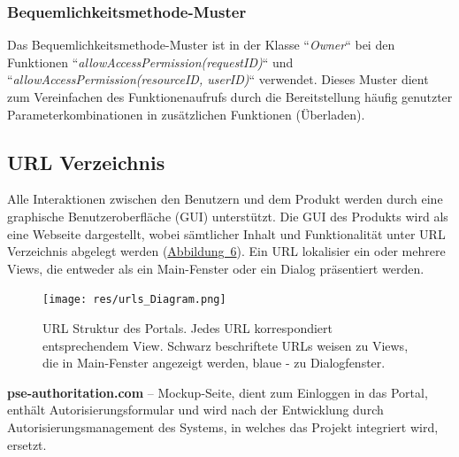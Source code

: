 \documentclass[parskip=full,11pt]{scrartcl}
\begin{document}
 \subsubsection*{Bequemlichkeitsmethode-Muster}
 Das Bequemlichkeitsmethode-Muster ist in der Klasse ``\textit{Owner}``
 bei den Funktionen ``\textit{allowAccessPermission(requestID)}`` und ``\textit{allowAccessPermission(resourceID, userID)}`` verwendet. Dieses Muster dient zum Vereinfachen des Funktionenaufrufs durch die Bereitstellung häufig
genutzter Parameterkombinationen in zusätzlichen Funktionen
(Überladen).
  \subsection{URL Verzeichnis}
Alle Interaktionen zwischen den Benutzern und dem Produkt werden durch eine graphische Benutzeroberfläche (GUI) unterstützt. Die \gls{GUI} des Produkts wird als eine Webseite dargestellt, wobei sämtlicher Inhalt und Funktionalität unter URL Verzeichnis abgelegt werden (\hyperref[URL Struktur]{\mbox{Abbildung 6}}). Ein URL lokalisier ein oder mehrere Views, die entweder als ein Main-Fenster oder ein Dialog präsentiert werden.  

\begin{figure}[ht!]
 	\centering
 	\texttt{[image: res/urls\_Diagram.png]}
 	\caption{URL Struktur des Portals. Jedes URL korrespondiert entsprechendem View. Schwarz beschriftete URLs weisen zu Views, die in Main-Fenster angezeigt werden, blaue - zu Dialogfenster. }
 	\label{URL-Struktur}
 \end{figure}
 
\textbf{pse-authoritation.com} – Mockup-Seite, dient zum Einloggen in das Portal, enthält Autorisierungsformular und wird nach der Entwicklung durch Autorisierungsmanagement des Systems, in welches das Projekt integriert wird, ersetzt. 
 
\end{document}
